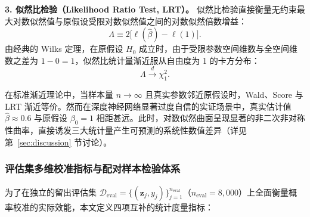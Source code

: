 \textbf{3. 似然比检验（Likelihood Ratio Test, LRT）。}
似然比检验直接衡量无约束最大对数似然值与原假设受限对数似然值之间的对数似然倍数增益：
\begin{equation}\label{eq:lrt_test_stat}
\Lambda \equiv 2 \big[ \ell(\hat\beta) - \ell(1) \big].
\end{equation}
由经典的 Wilks 定理，在原假设 $H_0$ 成立时，由于受限参数空间维数与全空间维数之差为 $1 - 0 = 1$，似然比统计量渐近服从自由度为 1 的卡方分布：
\begin{equation}\label{eq:lrt_distribution}
\Lambda \xrightarrow{d} \chi^2_1.
\end{equation}

在标准渐近理论中，当样本量 $n \to \infty$ 且真实参数邻近原假设时，Wald、Score 与 LRT 渐近等价。然而在深度神经网络显著过度自信的实证场景中，真实估计值 $\hat\beta \approx 0.6$ 与原假设 $\beta_0=1$ 相距甚远。此时，对数似然曲面呈现显著的非二次非对称性曲率，直接诱发三大统计量产生可预测的系统性数值差异（详见第~\ref{sec:discussion} 节讨论）。

\subsubsection{评估集多维校准指标与配对样本检验体系}

为了在独立的留出评估集 $\mathcal{D}_{\mathrm{eval}} = \{(\boldsymbol{z}_j, y_j)\}_{j=1}^{n_{\mathrm{eval}}}$（$n_{\mathrm{eval}}=8{,}000$）上全面衡量概率校准的实际效能，本文定义四项互补的统计度量指标：

